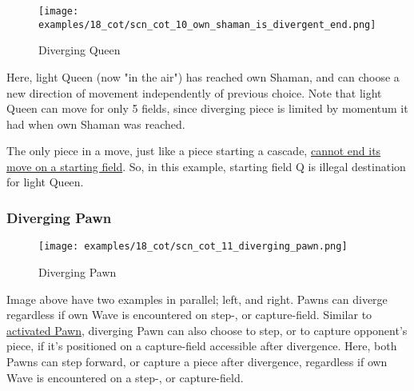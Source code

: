 \clearpage %

\vspace*{-2.1\baselineskip}
\noindent
\begin{figure}[!h]
\texttt{[image: examples/18\_cot/scn\_cot\_10\_own\_shaman\_is\_divergent\_end.png]}
\vspace*{-1.3\baselineskip}
\caption{Diverging Queen}
\label{fig:scn_cot_10_own_shaman_is_divergent_end}
\end{figure}

\vspace*{-0.4\baselineskip}
Here, light Queen (now "in the air") has reached own Shaman, and can choose a new
direction of movement independently of previous choice. Note that light Queen can
move for only 5 fields, since diverging piece is limited by momentum it had when
own Shaman was reached.

The only piece in a move, just like a piece starting a cascade,
\hyperref[fig:scn_mv_43_static_move_is_illegal_init]{cannot end its move on a starting field}.
So, in this example, starting field Q is illegal destination for light Queen.

\clearpage %

\subsubsection*{Diverging Pawn}
\label{sec:Conquest of Tlalocan/Shaman/Divergence/Diverging Pawn/1} %

\vspace*{-1.4\baselineskip}
\noindent
\begin{figure}[!h]
\texttt{[image: examples/18\_cot/scn\_cot\_11\_diverging\_pawn.png]}
\vspace*{-1.5\baselineskip}
\caption{Diverging Pawn}
\label{fig:scn_cot_11_diverging_pawn}
\end{figure}

\vspace*{-0.5\baselineskip}
Image above have two examples in parallel; left, and right. Pawns can diverge
regardless if own Wave is encountered on step-, or capture-field. Similar to
\hyperref[fig:scn_mv_31_activating_rush_pawn_init]{activated Pawn}, diverging
Pawn can also choose to step, or to capture opponent's piece, if it's positioned
on a capture-field accessible after divergence. \newline
\indent
Here, both Pawns can step forward, or capture a piece after divergence, regardless
if own Wave is encountered on a step-, or capture-field.

